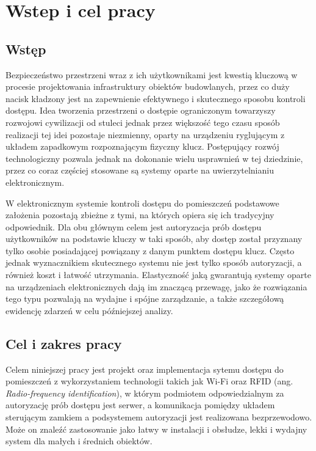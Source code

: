 \chapter{Wstep i cel pracy}
\label{chap:intro}

	\section{Wstęp}
		Bezpieczeństwo przestrzeni wraz z ich użytkownikami jest kwestią kluczową w procesie projektowania infrastruktury obiektów budowlanych, przez co duży nacisk kładzony jest na zapewnienie efektywnego i skutecznego sposobu kontroli dostępu. Idea tworzenia przestrzeni o dostępie ograniczonym towarzyszy rozwojowi cywilizacji od stuleci jednak przez większość tego czasu sposób realizacji tej idei pozostaje niezmienny, oparty na urządzeniu ryglującym z układem zapadkowym rozpoznającym fizyczny klucz. Postępujący rozwój technologiczny pozwala jednak na dokonanie wielu usprawnień w tej dziedzinie, przez co coraz częściej stosowane są systemy oparte na uwierzytelnianiu elektronicznym.

		W elektronicznym systemie kontroli dostępu do pomieszczeń podstawowe założenia pozostają zbieżne z tymi, na których opiera się ich tradycyjny odpowiednik. Dla obu głównym celem jest autoryzacja prób dostępu użytkowników na podstawie kluczy w taki sposób, aby dostęp został przyznany tylko osobie posiadającej powiązany z danym punktem dostępu klucz.
		Często jednak wyznacznikiem skutecznego systemu nie jest tylko sposób autoryzacji, a również koszt i łatwość utrzymania. Elastyczność jaką gwarantują systemy oparte na urządzeniach elektronicznych dają im znaczącą przewagę, jako że rozwiązania tego typu pozwalają na wydajne i spójne zarządzanie, a także szczegółową ewidencję zdarzeń w celu późniejszej analizy.

	\section{Cel i zakres pracy}

		Celem niniejszej pracy jest projekt oraz implementacja sytemu dostępu do pomieszczeń z wykorzystaniem technologii takich jak Wi-Fi oraz RFID (ang. \textit{Radio-frequency identification}), w którym podmiotem odpowiedzialnym za autoryzację prób dostępu jest serwer, a komunikacja pomiędzy układem sterującym zamkiem a podsystemem autoryzacji jest realizowana bezprzewodowo. Może on znaleźć zastosowanie jako łatwy w instalacji i obsłudze, lekki i wydajny system dla małych i średnich obiektów.

